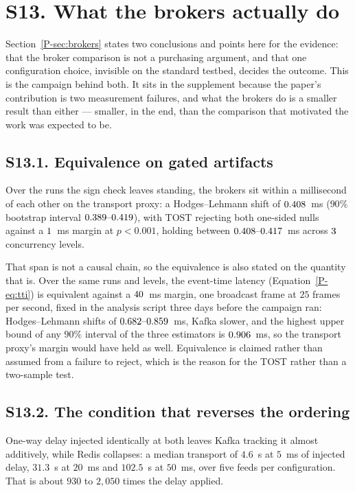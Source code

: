 \documentclass[10pt,journal,onecolumn]{IEEEtran}
\newcommand{\kafka}{Kafka}
\newcommand{\redis}{Redis}
\newcommand{\mainBrokers}{\ref{P-sec:brokers}}        %
\begin{document}
\section{S13. What the brokers actually do}
\label{sec:brokers-full}

Section~\mainBrokers{} states two conclusions and points here for the evidence: that the broker
comparison is not a purchasing argument, and that one configuration choice, invisible on the
standard testbed, decides the outcome. This is the campaign behind both. It sits in the
supplement because the paper's contribution is two measurement failures, and what the brokers
do is a smaller result than either --- smaller, in the end, than the comparison that motivated
the work was expected to be.

\subsection{S13.1. Equivalence on gated artifacts}

Over the runs the sign check leaves standing, the brokers sit within a millisecond of each
other on the transport proxy: a Hodges--Lehmann shift of $0.408$~ms ($90\%$ bootstrap interval
$\tostHLCI$), with TOST rejecting both one-sided nulls against a $1$~ms margin at
$p < 0.001$, holding between $\tostHLRange$~ms across $3$ concurrency levels.

That span is not a causal chain, so the equivalence is also stated on the quantity that is.
Over the same runs and levels, the event-time latency (Equation~\ref{P-eq:tti}) is
equivalent against a $40$~ms margin, one broadcast frame at $25$ frames per second,
fixed in the analysis script three days before the campaign ran: Hodges--Lehmann shifts of
$\ttiTostHLRange$~ms, \kafka{} slower, and the highest upper bound of any $90\%$ interval of the
three estimators is $0.906$~ms, so the transport proxy's margin would have held as
well. Equivalence is
claimed rather than assumed from a failure to reject, which is the reason for the TOST rather
than a two-sample test.

\subsection{S13.2. The condition that reverses the ordering}

One-way delay injected identically at both leaves \kafka{} tracking it almost additively,
while \redis{} collapses: a median transport of $4.6$~s at $5$~ms of injected delay,
$31.3$~s at $20$~ms and $102.5$~s at $50$~ms, over five feeds per configuration. That is about
$930$ to $2{,}050$ times the delay applied.
\end{document}
